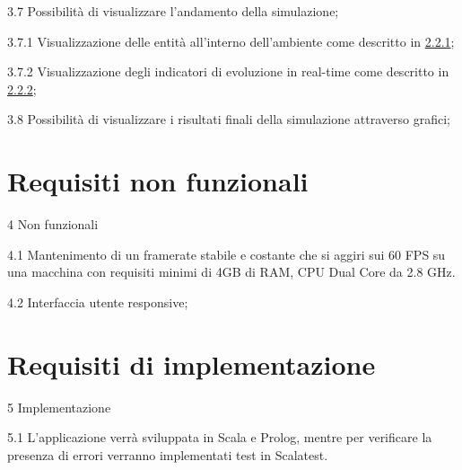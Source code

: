 \begin{myEnumerate}
\begin{myEnumerate}[label*=\arabic*.]
	\item[3.7] Possibilità di visualizzare l'andamento della simulazione;	
	\begin{myEnumerate}[label*=\arabic*.]
		\item[3.7.1] Visualizzazione delle entità all'interno dell'ambiente come descritto in \hyperref[sec:2.2.1]{2.2.1};
		\item[3.7.2] Visualizzazione degli indicatori di evoluzione in real-time come descritto in \hyperref[sec:2.2.2]{2.2.2};
	\end{myEnumerate}
	\item[3.8] Possibilità di visualizzare i risultati finali della simulazione attraverso grafici;
	\end{myEnumerate}
\end{myEnumerate}

\section{Requisiti non funzionali}

\begin{myEnumerate}[label*=\arabic*.]
	\item[4] Non funzionali
	\begin{myEnumerate}[label*=\arabic*.]
		\label{sec:cpu}
		\item[4.1] Mantenimento di un framerate stabile e costante che si aggiri sui 60 FPS su una macchina con requisiti minimi di 4GB di RAM, CPU Dual Core da 2.8 GHz.
		\item[4.2] Interfaccia utente responsive;
	\end{myEnumerate}
\end{myEnumerate}


\section{Requisiti di implementazione}

\begin{myEnumerate}[label*=\arabic*.]
	\item[5] Implementazione
	\begin{myEnumerate}[label*=\arabic*.]
		\item[5.1] L'applicazione verrà sviluppata in Scala e Prolog, mentre per verificare la presenza di errori verranno implementati test in Scalatest.
	\end{myEnumerate}
\end{myEnumerate}